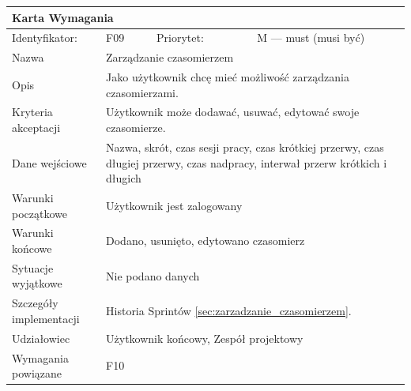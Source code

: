 \documentclass[a4paper,11pt]{report}
\begin{document}
		\begin{tabular}{|p{3cm}|p{2cm}|p{2cm}|p{6cm}|}
		\hline
		\multicolumn{4}{|p{12 cm}|}{Karta Wymagania}\\
		\hline
		Identyfikator: & F09 & Priorytet: & M — must (musi być)\\
		\hline
		Nazwa & \multicolumn{3}{|p{10 cm}|}{Zarządzanie czasomierzem}\\
		\hline
		Opis & \multicolumn{3}{|p{10 cm}|}{Jako użytkownik chcę mieć możliwość zarządzania czasomierzami.}\\
		\hline
		Kryteria akceptacji & \multicolumn{3}{|p{10 cm}|}{Użytkownik może dodawać, usuwać, edytować swoje czasomierze.}\\
		\hline
		Dane wejściowe & \multicolumn{3}{|p{10 cm}|}{Nazwa, skrót, czas sesji pracy, czas krótkiej przerwy, czas długiej przerwy, czas nadpracy, interwał przerw krótkich i długich}\\
		\hline
		Warunki początkowe & \multicolumn{3}{|p{10 cm}|}{Użytkownik jest zalogowany}\\
		\hline
		Warunki końcowe & \multicolumn{3}{|p{10 cm}|}{Dodano, usunięto, edytowano czasomierz}\\
		\hline
		Sytuacje wyjątkowe & \multicolumn{3}{|p{10 cm}|}{Nie podano danych}\\
		\hline
		Szczegóły implementacji & \multicolumn{3}{|p{10 cm}|}{Historia Sprintów \ref{sec:zarzadzanie_czasomierzem}.}\\
		\hline
		Udziałowiec & \multicolumn{3}{|p{10 cm}|}{Użytkownik końcowy, Zespół projektowy}\\
		\hline
		Wymagania powiązane & \multicolumn{3}{|p{10 cm}|}{F10}\\
		\hline
		\end{tabular}
		\newline
		\vspace*{0,2 cm}
		\newline
\end{document}
